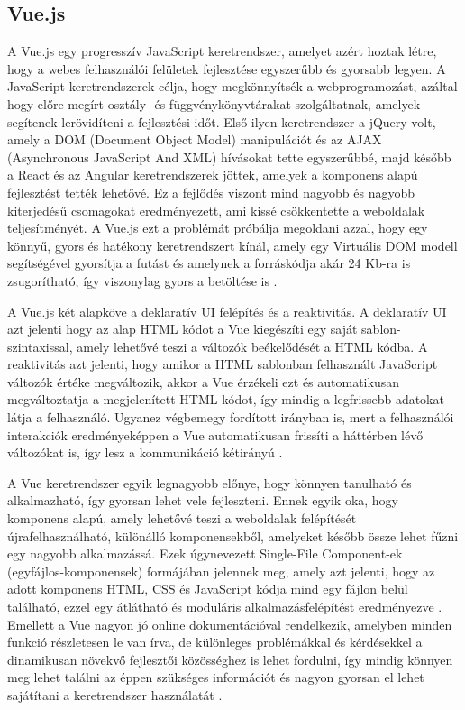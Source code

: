 \subsection{Vue.js}
A Vue.js egy progresszív JavaScript keretrendszer, amelyet azért hoztak létre, hogy a webes felhasználói felületek fejlesztése egyszerűbb és gyorsabb legyen. A JavaScript keretrendszerek célja, hogy megkönnyítsék a webprogramozást, azáltal hogy előre megírt osztály- és függvénykönyvtárakat szolgáltatnak, amelyek segítenek lerövidíteni a fejlesztési időt. Első ilyen keretrendszer a jQuery volt, amely a DOM (Document Object Model) manipulációt és az AJAX (Asynchronous JavaScript And XML) hívásokat tette egyszerűbbé, majd később a React és az Angular keretrendszerek jöttek, amelyek a komponens alapú fejlesztést tették lehetővé. Ez a fejlődés viszont mind nagyobb és nagyobb kiterjedésű csomagokat eredményezett, ami kissé csökkentette a weboldalak teljesítményét. A Vue.js ezt a problémát próbálja megoldani azzal, hogy egy könnyű, gyors és hatékony keretrendszert kínál, amely egy Virtuális DOM modell segítségével gyorsítja a futást és amelynek a forráskódja akár 24 Kb-ra is zsugorítható, így viszonylag gyors a betöltése is \cite{vueinaction}.

A Vue.js két alapköve a deklaratív UI felépítés és a reaktivitás. A deklaratív UI azt jelenti hogy az alap HTML kódot a Vue kiegészíti egy saját sablon-szintaxissal, amely lehetővé teszi a változók beékelődését a HTML kódba. A reaktivitás azt jelenti, hogy amikor a HTML sablonban felhasznált JavaScript változók értéke megváltozik, akkor a Vue érzékeli ezt és automatikusan megváltoztatja a megjelenített HTML kódot, így mindig a legfrissebb adatokat látja a felhasználó. Ugyanez végbemegy fordított irányban is, mert a felhasználói interakciók eredményeképpen a Vue automatikusan frissíti a háttérben lévő változókat is, így lesz a kommunikáció kétirányú \cite{vueinaction,vue3}.

A Vue keretrendszer egyik legnagyobb előnye, hogy könnyen tanulható és alkalmazható, így gyorsan lehet vele fejleszteni. Ennek egyik oka, hogy komponens alapú, amely lehetővé teszi a weboldalak felépítését újrafelhasználható, különálló komponensekből, amelyeket később össze lehet fűzni egy nagyobb alkalmazássá. Ezek úgynevezett Single-File Component-ek (egyfájlos-komponensek) formájában jelennek meg, amely azt jelenti, hogy az adott komponens HTML, CSS és JavaScript kódja mind egy fájlon belül található, ezzel egy átlátható és moduláris alkalmazásfelépítést eredményezve \cite{vue3}. Emellett a Vue nagyon jó online dokumentációval rendelkezik, amelyben minden funkció részletesen le van írva, de különleges problémákkal és kérdésekkel a dinamikusan növekvő fejlesztői közösséghez is lehet fordulni, így mindig könnyen meg lehet találni az éppen szükséges információt és nagyon gyorsan el lehet sajátítani a keretrendszer használatát \cite{vueinaction}.

